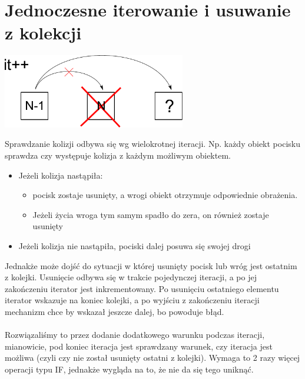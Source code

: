 \documentclass[a4paper,twoside]{article}
\begin{document}
		\section{Jednoczesne iterowanie i usuwanie z kolekcji}
			\begin{center}
				\includegraphics[width=0.6\textwidth]{./images/iteracja01}
			\end{center}
			Sprawdzanie kolizji odbywa się wg wielokrotnej iteracji. Np. każdy obiekt pocisku sprawdza czy występuje kolizja z każdym możliwym obiektem.
			\begin{itemize}
				\item Jeżeli kolizja nastąpiła:
				\begin{itemize}
					\item pocisk zostaje usunięty, a wrogi obiekt otrzymuje odpowiednie obrażenia.
					\item Jeżeli życia wroga tym samym spadło do zera, on również zostaje usunięty
				\end{itemize}
				\item Jeżeli kolizja nie nastąpiła, pociski dalej posuwa się swojej drogi
			\end{itemize}
			Jednakże może dojść do sytuacji w której usunięty pocisk lub wróg jest ostatnim z kolejki. Usunięcie odbywa się w trakcie pojedynczej iteracji, a po jej zakończeniu iterator jest inkrementowany. Po usunięciu ostatniego elementu iterator wskazuje na koniec kolejki, a po wyjściu z zakończeniu iteracji mechanizm chce by wskazał jeszcze dalej, bo powoduje błąd.\\\\
			Rozwiązaliśmy to przez dodanie dodatkowego warunku podczas iteracji, mianowicie, pod koniec iteracja jest sprawdzany warunek, czy iteracja jest możliwa (czyli czy nie został usunięty ostatni z kolejki). Wymaga to 2 razy więcej operacji typu IF, jednakże wygląda na to, że nie da się tego uniknąć.
		
		\newpage
\end{document}
